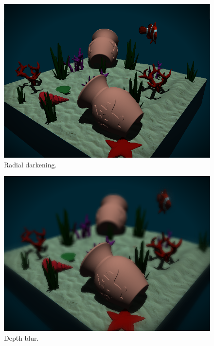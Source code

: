 \documentclass{article}
\begin{document}
\begin{figure}[h]
    \centering
    \includegraphics[width=\columnwidth]{imgs/blur_off.png}
    \caption{Radial darkening.}
    \label{fig:radial_darkening}
\end{figure}

\begin{figure}[h]
    \centering
    \includegraphics[width=\columnwidth]{imgs/blur_on.png}
    \caption{Depth blur.}
    \label{fig:blur}
\end{figure}
\end{document}
